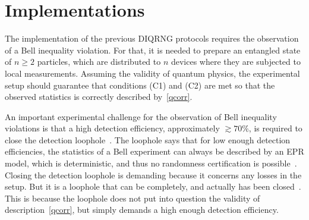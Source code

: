 \documentclass[11pt,a4paper]{article}
\begin{document}
\section{Implementations}
\label{implementations}

The implementation of the previous DIQRNG protocols requires the observation of a Bell inequality violation.
For that, it is needed to prepare an entangled state of $n\geq 2$  particles, which are distributed to $n$ devices where
they are subjected to local measurements. Assuming the validity of quantum physics, the experimental setup should guarantee that conditions (C1) and (C2) are met so that the observed statistics is correctly described by~\eqref{qcorr}. %

An important experimental challenge for the observation of Bell inequality violations is that a high detection efficiency, approximately $\gtrsim 70\%$, is required to close the detection loophole~\cite{pearle}. The loophole says that for low enough detection efficiencies, the statistics of a Bell experiment can always be described by an EPR model, which is deterministic, and thus no randomness certification is possible~\cite{deteff,passaro}. Closing the detection loophole is demanding because it concerns any losses in the setup. But it is a loophole that can be completely, and actually has been closed~\cite{rowe,monroe,weinfurter,zeilinger,kwiat,hanson,giustina,nistexp}. This is because the loophole does not put into question the validity of description~\eqref{qcorr}, but simply demands a high enough detection efficiency.
\end{document}
